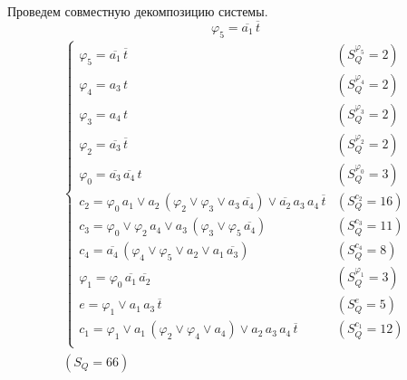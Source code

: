 \documentclass{article}
\begin{document}
\noindent\begin{minipage}{\textwidth}
Проведем совместную декомпозицию системы. \[\varphi_{5} = \overline{a_1}\,\overline{t}\]
\[\begin{matrix}
    \begin{cases}
        \varphi_{5} = \overline{a_1}\,\overline{t} & (S_Q^{\varphi_{5}} = 2) \\
        \varphi_{4} = a_3\,t & (S_Q^{\varphi_{4}} = 2) \\
        \varphi_{3} = a_4\,t & (S_Q^{\varphi_{3}} = 2) \\
        \varphi_{2} = \overline{a_3}\,\overline{t} & (S_Q^{\varphi_{2}} = 2) \\
        \varphi_{0} = \overline{a_3}\,\overline{a_4}\,t & (S_Q^{\varphi_{0}} = 3) \\
        c_2 = \varphi_{0}\,a_1 \lor a_2\,\left(\varphi_{2} \lor \varphi_{3} \lor a_3\,\overline{a_4}\right) \lor \overline{a_2}\,a_3\,a_4\,\overline{t} & (S_Q^{c_2} = 16) \\
        c_3 = \varphi_{0} \lor \varphi_{2}\,a_4 \lor a_3\,\left(\varphi_{3} \lor \varphi_{5}\,\overline{a_4}\right) & (S_Q^{c_3} = 11) \\
        c_4 = \overline{a_4}\,\left(\varphi_{4} \lor \varphi_{5} \lor a_2 \lor a_1\,\overline{a_3}\right) & (S_Q^{c_4} = 8) \\
        \varphi_{1} = \varphi_{0}\,\overline{a_1}\,\overline{a_2} & (S_Q^{\varphi_{1}} = 3) \\
        e = \varphi_{1} \lor a_1\,a_3\,\overline{t} & (S_Q^{e} = 5) \\
        c_1 = \varphi_{1} \lor a_1\,\left(\varphi_{2} \lor \varphi_{4} \lor a_4\right) \lor a_2\,a_3\,a_4\,\overline{t} & (S_Q^{c_1} = 12) \\
    \end{cases} \\ (S_Q = 66)
\end{matrix}\] \\ \phantom{0}
\end{minipage}
\end{document}

